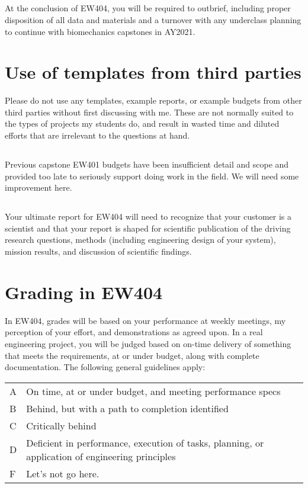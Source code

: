 \documentclass[10pt,courier]{navymemo}
\begin{document}
\subsection{} At the conclusion of EW404, you will be required to outbrief, including proper disposition of all data and materials and a turnover with any underclass planning to continue with biomechanics capstones in AY2021. 

\section{Use of templates from third parties} Please do not use any templates, example reports, or example budgets from other third parties without first discussing with me. These are not normally suited to the types of projects my students do, and result in wasted time and diluted efforts that are irrelevant to the questions at hand. 
\subsection{} Previous capstone EW401 budgets have been insufficient detail and scope and provided too late to seriously support doing work in the field. We will need some improvement here. 
\subsection{} Your ultimate report for EW404 will need to recognize that your customer is a scientist and that your report is shaped for scientific publication of the driving research questions, methods (including engineering design of your system), mission results, and discussion of scientific findings.


\section{Grading in EW404}
In EW404, grades will be based on your performance at weekly meetings, my perception of your effort, and demonstrations as agreed upon.  In a real engineering project, you will be judged based on on-time delivery of something that meets the requirements, at or under budget, along with complete documentation. The following general guidelines apply: 
\begin{center}
\begin{tabular}{lp{5in}}
A & On time, at or under budget, and meeting performance specs \\
B & Behind, but with a path to completion identified \\
C & Critically behind \\
D & Deficient in performance, execution of tasks, planning, or application of engineering principles \\
F & Let's not go here. \\
\end{tabular}
\end{center}
\end{document}
